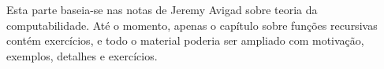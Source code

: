 \documentclass[../../include/open-logic-part]{subfiles}
\begin{document}

\begin{editorial}
  Esta parte baseia-se nas notas de Jeremy Avigad sobre teoria da
  computabilidade. Até o momento, apenas o capítulo sobre funções recursivas
  contém exercícios, e todo o material poderia ser ampliado com motivação,
  exemplos, detalhes e exercícios.
\end{editorial}



\OLEndPartHook
\end{document}
